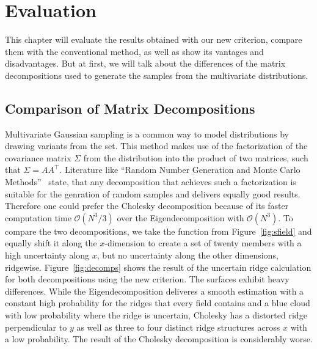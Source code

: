 \chapter{Evaluation}\label{chap:Eval}

This chapter will evaluate the results obtained with our new criterion,
compare them with the conventional method, as well as show its vantages
and disadvantages. But at first, we will talk about the differences of
the matrix decompositions used to generate the samples from the
multivariate distributions.

\section{Comparison of Matrix Decompositions}\label{chap:evalMD}

Multivariate Gaussian sampling is a common way to model distributions
by drawing variants from the set. This method makes use of the
factorization of the covariance matrix $\Sigma$ from the distribution into
the product of two matrices, such that $\Sigma = AA^\top$. Literature
like ``Random Number Generation and Monte Carlo Methods''~\cite{Monte}
state, that any decomposition that achieves such a factorization is
suitable for the genration of random samples and delivers equally
good results. Therefore one could prefer the Cholesky decomposition
because of its faster computation time $\mathcal{O}(N^3/3)$ over
the Eigendecomposition with $\mathcal{O}(N^3)$. To compare the two
decompositions, we take the function from Figure~\ref{fig:sfield} and
equally shift it along the $x$-dimension to create a set of twenty
members with a high uncertainty along $x$, but no uncertainty along
the other dimensions, ridgewise. Figure~\ref{fig:decomps} shows the
result of the uncertain ridge calculation for both decompositions using
the new criterion. The surfaces exhibit heavy differences. While the
Eigendecomposition deliveres a smooth estimation with a constant high
probability for the ridges that every field contains and a blue cloud
with low probability where the ridge is uncertain, Cholesky has a
distorted ridge perpendicular to $y$ as well as three to four distinct
ridge structures across $x$ with a low probability. The result of the
Cholesky decomposition is considerably worse.

